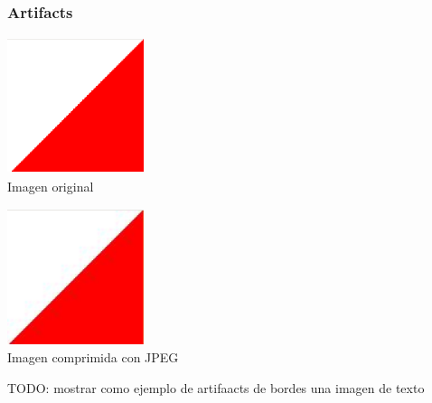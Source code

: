 \documentclass{beamer}
\begin{document}
\begin{frame}
    \frametitle{Artifacts}
    \begin{minipage}[t]{0.4\linewidth}
        \begin{center}
            \includegraphics[width=4cm, height=4cm]{fig/borde.png}\\
            Imagen original
        \end{center}
    \end{minipage}
    \hfill
    \begin{minipage}[t]{0.4\linewidth}
        \begin{center}
        \includegraphics[width=4cm, height=4cm]{fig/borde_jpeg.png}\\
        Imagen comprimida con JPEG
        \end{center}
    \end{minipage}
\end{frame}

\begin{frame}
    TODO: mostrar como ejemplo de artifaacts de bordes una imagen de texto

\end{frame}
\end{document}
